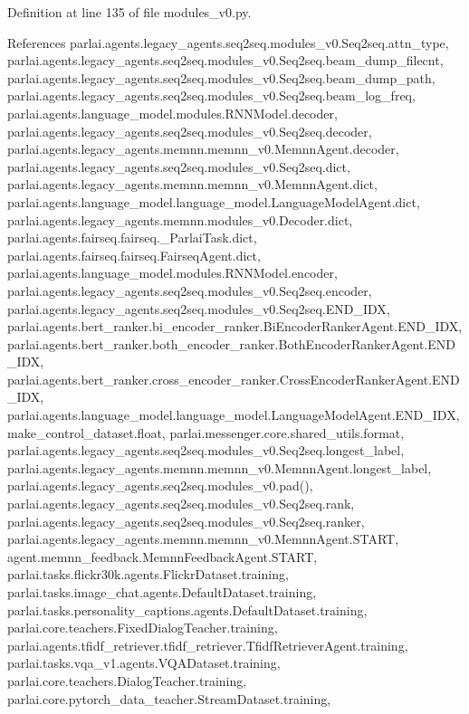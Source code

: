 Definition at line 135 of file modules\+\_\+v0.\+py.



References parlai.\+agents.\+legacy\+\_\+agents.\+seq2seq.\+modules\+\_\+v0.\+Seq2seq.\+attn\+\_\+type, parlai.\+agents.\+legacy\+\_\+agents.\+seq2seq.\+modules\+\_\+v0.\+Seq2seq.\+beam\+\_\+dump\+\_\+filecnt, parlai.\+agents.\+legacy\+\_\+agents.\+seq2seq.\+modules\+\_\+v0.\+Seq2seq.\+beam\+\_\+dump\+\_\+path, parlai.\+agents.\+legacy\+\_\+agents.\+seq2seq.\+modules\+\_\+v0.\+Seq2seq.\+beam\+\_\+log\+\_\+freq, parlai.\+agents.\+language\+\_\+model.\+modules.\+R\+N\+N\+Model.\+decoder, parlai.\+agents.\+legacy\+\_\+agents.\+seq2seq.\+modules\+\_\+v0.\+Seq2seq.\+decoder, parlai.\+agents.\+legacy\+\_\+agents.\+memnn.\+memnn\+\_\+v0.\+Memnn\+Agent.\+decoder, parlai.\+agents.\+legacy\+\_\+agents.\+seq2seq.\+modules\+\_\+v0.\+Seq2seq.\+dict, parlai.\+agents.\+legacy\+\_\+agents.\+memnn.\+memnn\+\_\+v0.\+Memnn\+Agent.\+dict, parlai.\+agents.\+language\+\_\+model.\+language\+\_\+model.\+Language\+Model\+Agent.\+dict, parlai.\+agents.\+legacy\+\_\+agents.\+memnn.\+modules\+\_\+v0.\+Decoder.\+dict, parlai.\+agents.\+fairseq.\+fairseq.\+\_\+\+Parlai\+Task.\+dict, parlai.\+agents.\+fairseq.\+fairseq.\+Fairseq\+Agent.\+dict, parlai.\+agents.\+language\+\_\+model.\+modules.\+R\+N\+N\+Model.\+encoder, parlai.\+agents.\+legacy\+\_\+agents.\+seq2seq.\+modules\+\_\+v0.\+Seq2seq.\+encoder, parlai.\+agents.\+legacy\+\_\+agents.\+seq2seq.\+modules\+\_\+v0.\+Seq2seq.\+E\+N\+D\+\_\+\+I\+DX, parlai.\+agents.\+bert\+\_\+ranker.\+bi\+\_\+encoder\+\_\+ranker.\+Bi\+Encoder\+Ranker\+Agent.\+E\+N\+D\+\_\+\+I\+DX, parlai.\+agents.\+bert\+\_\+ranker.\+both\+\_\+encoder\+\_\+ranker.\+Both\+Encoder\+Ranker\+Agent.\+E\+N\+D\+\_\+\+I\+DX, parlai.\+agents.\+bert\+\_\+ranker.\+cross\+\_\+encoder\+\_\+ranker.\+Cross\+Encoder\+Ranker\+Agent.\+E\+N\+D\+\_\+\+I\+DX, parlai.\+agents.\+language\+\_\+model.\+language\+\_\+model.\+Language\+Model\+Agent.\+E\+N\+D\+\_\+\+I\+DX, make\+\_\+control\+\_\+dataset.\+float, parlai.\+messenger.\+core.\+shared\+\_\+utils.\+format, parlai.\+agents.\+legacy\+\_\+agents.\+seq2seq.\+modules\+\_\+v0.\+Seq2seq.\+longest\+\_\+label, parlai.\+agents.\+legacy\+\_\+agents.\+memnn.\+memnn\+\_\+v0.\+Memnn\+Agent.\+longest\+\_\+label, parlai.\+agents.\+legacy\+\_\+agents.\+seq2seq.\+modules\+\_\+v0.\+pad(), parlai.\+agents.\+legacy\+\_\+agents.\+seq2seq.\+modules\+\_\+v0.\+Seq2seq.\+rank, parlai.\+agents.\+legacy\+\_\+agents.\+seq2seq.\+modules\+\_\+v0.\+Seq2seq.\+ranker, parlai.\+agents.\+legacy\+\_\+agents.\+memnn.\+memnn\+\_\+v0.\+Memnn\+Agent.\+S\+T\+A\+RT, agent.\+memnn\+\_\+feedback.\+Memnn\+Feedback\+Agent.\+S\+T\+A\+RT, parlai.\+tasks.\+flickr30k.\+agents.\+Flickr\+Dataset.\+training, parlai.\+tasks.\+image\+\_\+chat.\+agents.\+Default\+Dataset.\+training, parlai.\+tasks.\+personality\+\_\+captions.\+agents.\+Default\+Dataset.\+training, parlai.\+core.\+teachers.\+Fixed\+Dialog\+Teacher.\+training, parlai.\+agents.\+tfidf\+\_\+retriever.\+tfidf\+\_\+retriever.\+Tfidf\+Retriever\+Agent.\+training, parlai.\+tasks.\+vqa\+\_\+v1.\+agents.\+V\+Q\+A\+Dataset.\+training, parlai.\+core.\+teachers.\+Dialog\+Teacher.\+training, parlai.\+core.\+pytorch\+\_\+data\+\_\+teacher.\+Stream\+Dataset.\+training, 